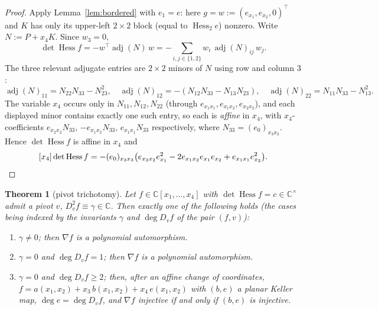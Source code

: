 \documentclass[11pt]{article}
\theoremstyle{plain}
\newtheorem{theorem}{Theorem}[section]
\theoremstyle{definition}
\newcommand{\C}{\mathbb{C}}
\newcommand{\Hess}{\operatorname{Hess}}
\newcommand{\adj}{\operatorname{adj}}
\begin{document}
\begin{proof}
Apply Lemma~\ref{lem:bordered} with $e_1=e$: here
$g=w:=(e_{x_1},e_{x_2},0)^{\top}$ and $K$ has only its upper-left
$2\times2$ block (equal to $\Hess_2e$) nonzero. Write $N:=P+x_4K$. Since
$w_3=0$,
\[
\det\Hess f=-w^{\top}\adj(N)\,w
=-\sum_{i,j\in\{1,2\}}w_i\,\adj(N)_{ij}\,w_j .
\]
The three relevant adjugate entries are $2\times2$ minors of $N$ using
row and column $3$:
\[
\adj(N)_{11}=N_{22}N_{33}-N_{23}^2,\quad
\adj(N)_{12}=-(N_{12}N_{33}-N_{13}N_{23}),\quad
\adj(N)_{22}=N_{11}N_{33}-N_{13}^2 .
\]
The variable $x_4$ occurs only in $N_{11},N_{12},N_{22}$ (through
$e_{x_1x_1},e_{x_1x_2},e_{x_2x_2}$), and each displayed minor contains
exactly one such entry, so each is \emph{affine} in $x_4$, with
$x_4$-coefficients $e_{x_2x_2}N_{33}$, $-e_{x_1x_2}N_{33}$,
$e_{x_1x_1}N_{33}$ respectively, where $N_{33}=(e_0)_{x_3x_3}$. Hence
$\det\Hess f$ is affine in $x_4$ and
\[
[x_4]\det\Hess f
=-(e_0)_{x_3x_3}\bigl(e_{x_2x_2}e_{x_1}^2-2e_{x_1x_2}e_{x_1}e_{x_2}
+e_{x_1x_1}e_{x_2}^2\bigr). \qedhere
\]
\end{proof}

\begin{theorem}[pivot trichotomy]\label{thm:tri}
Let $f\in\C[x_1,\dots,x_4]$ with $\det\Hess f=c\in\C^{\times}$ admit a
pivot $v$, $D_v^2f\equiv\gamma\in\C$. Then exactly one of the following
holds (the cases being indexed by the invariants $\gamma$ and
$\deg D_vf$ of the pair $(f,v)$):
\begin{enumerate}
\item[\rm(i)] $\gamma\ne0$; then $\nabla f$ is a polynomial
automorphism.
\item[\rm(ii)] $\gamma=0$ and $\deg D_vf=1$; then $\nabla f$ is a
polynomial automorphism.
\item[\rm(iii)] $\gamma=0$ and $\deg D_vf\ge2$; then, after an affine
change of coordinates,
$f=a(x_1,x_2)+x_3\,b(x_1,x_2)+x_4\,e(x_1,x_2)$ with $(b,e)$ a planar
Keller map, $\deg e=\deg D_vf$, and $\nabla f$ injective if and only if
$(b,e)$ is injective.
\end{enumerate}
\end{theorem}
\end{document}

